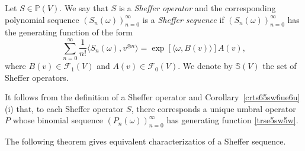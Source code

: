 \documentclass[12pt]{article}
\theoremstyle{remark}
\theoremstyle{remark}
\theoremstyle{remark}
\begin{document}
 Let $S\in\mathbb P(V)$. We say that $S$ is a {\it Sheffer operator} and the corresponding polynomial sequence $(S_n(\omega))_{n=0}^\infty$ is a {\it Sheffer sequence} if $(S_n(\omega))_{n=0}^\infty$ has  the generating function of the form  
\begin{equation}\sum_{n=0}^\infty \frac1{n!}\langle S_n(\omega), v^{\otimes n}\rangle=\exp [\langle \omega, B(v)\rangle]A(v),\label{ldj84n}\end{equation} 
where $B(v)\in \mathcal F_1(V)$ and $A(v)\in \mathcal F_0(V)$. We denote by $\mathbb S(V)$ the set of Sheffer operators. 


It follows from the definition of a Sheffer operator and Corollary~\ref{crts65sw6ue6u} (i)  that, to each Sheffer operator $S$, there corresponds a unique umbral operator $P$ whose 
binomial sequence $(P_n(\omega))_{n=0}^\infty$ has generating function \eqref{trse5sw5w}.

The following theorem gives  equivalent characterizatios of a Sheffer sequence.
\end{document}
